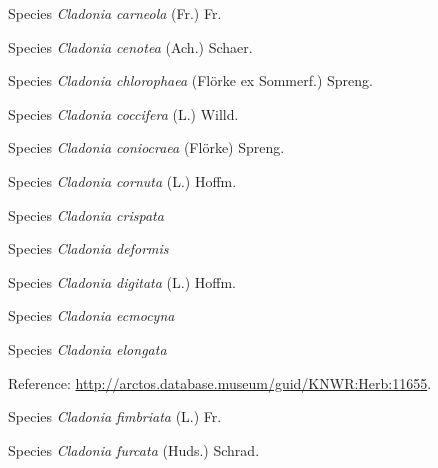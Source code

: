 \documentclass[9pt, article]{memoir}
\begin{document}
\begin{multicols}{2}
\vspace{6pt}\noindent\hspace{36pt}Species \textit{Cladonia carneola} (Fr.) Fr.


\vspace{6pt}\noindent\hspace{36pt}Species \textit{Cladonia cenotea} (Ach.) Schaer.


\vspace{6pt}\noindent\hspace{36pt}Species \textit{Cladonia chlorophaea} (Flörke ex Sommerf.) Spreng.


\vspace{6pt}\noindent\hspace{36pt}Species \textit{Cladonia coccifera} (L.) Willd.


\vspace{6pt}\noindent\hspace{36pt}Species \textit{Cladonia coniocraea} (Flörke) Spreng.


\vspace{6pt}\noindent\hspace{36pt}Species \textit{Cladonia cornuta} (L.) Hoffm.


\vspace{6pt}\noindent\hspace{36pt}Species \textit{Cladonia crispata}


\vspace{6pt}\noindent\hspace{36pt}Species \textit{Cladonia deformis}


\vspace{6pt}\noindent\hspace{36pt}Species \textit{Cladonia digitata} (L.) Hoffm.


\vspace{6pt}\noindent\hspace{36pt}Species \textit{Cladonia ecmocyna}


\vspace{6pt}\noindent\hspace{36pt}Species \textit{Cladonia elongata}


\vspace{6pt}Reference: 
\url{http://arctos.database.museum/guid/KNWR:Herb:11655}.

\vspace{6pt}\noindent\hspace{36pt}Species \textit{Cladonia fimbriata} (L.) Fr.


\vspace{6pt}\noindent\hspace{36pt}Species \textit{Cladonia furcata} (Huds.) Schrad.



\end{multicols}
\end{document}
